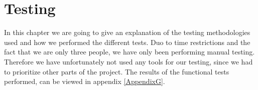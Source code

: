 
\chapter{Testing}
\label{Testing}
\nocite{SoftwareTesting}










In this chapter we are going to give an explanation of the testing methodologies used and how we performed the different tests.
Duo to time restrictions and the fact that we are only three people, we have only been performing manual testing.
Therefore we have unfortunately not used any tools for our testing, since we had to prioritize other parts of the project.
The results of the functional tests performed, can be viewed in appendix \ref{AppendixG}.

